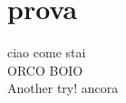 \documentclass{article}
\begin{document}
    \section{prova}
        ciao come stai\\
        ORCO BOIO\\
        Another try! ancora
\end{document}
